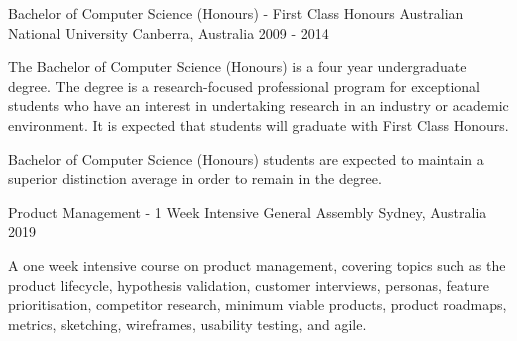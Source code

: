 


\begin{cventries}


\cventry
{Bachelor of Computer Science (Honours) - First Class Honours} %
{Australian National University} %
{Canberra, Australia} %
{2009 - 2014} %
{ %
\begin{cvitems}
\item {The Bachelor of Computer Science (Honours) is a four year undergraduate degree. The degree is a research-focused professional program for exceptional students who have an interest in undertaking research in an industry or academic environment. It is expected that students will graduate with First Class Honours.}
\item {Bachelor of Computer Science (Honours) students are expected to maintain a superior distinction average in order to remain in the degree.}
\end{cvitems}
}
{}

\cventry
{Product Management - 1 Week Intensive} %
{General Assembly} %
{Sydney, Australia} %
{2019} %
{ %
\begin{cvitems}
\item {
  A one week intensive course on product management, covering topics such as the product lifecycle, hypothesis validation, customer interviews, personas, feature prioritisation, competitor research, minimum viable products, product roadmaps, metrics, sketching, wireframes, usability testing, and agile.
}
\end{cvitems}
}
{}


\end{cventries}